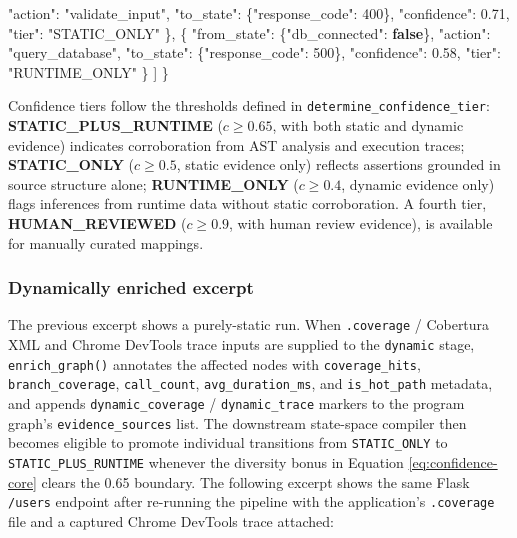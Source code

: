\documentclass[
]{article}
\newenvironment{Shaded}{}{}
\newcommand{\DataTypeTok}[1]{\textcolor[rgb]{0.56,0.13,0.00}{#1}}
\newcommand{\DecValTok}[1]{\textcolor[rgb]{0.25,0.63,0.44}{#1}}
\newcommand{\FloatTok}[1]{\textcolor[rgb]{0.25,0.63,0.44}{#1}}
\newcommand{\FunctionTok}[1]{\textcolor[rgb]{0.02,0.16,0.49}{#1}}
\newcommand{\KeywordTok}[1]{\textcolor[rgb]{0.00,0.44,0.13}{\textbf{#1}}}
\newcommand{\OtherTok}[1]{\textcolor[rgb]{0.00,0.44,0.13}{#1}}
\newcommand{\StringTok}[1]{\textcolor[rgb]{0.25,0.44,0.63}{#1}}
\begin{document}
\begin{Shaded}
\begin{Highlighting}[]
      \DataTypeTok{"action"}\FunctionTok{:} \StringTok{"validate\_input"}\FunctionTok{,}
      \DataTypeTok{"to\_state"}\FunctionTok{:} \FunctionTok{\{}\DataTypeTok{"response\_code"}\FunctionTok{:} \DecValTok{400}\FunctionTok{\},}
      \DataTypeTok{"confidence"}\FunctionTok{:} \FloatTok{0.71}\FunctionTok{,}
      \DataTypeTok{"tier"}\FunctionTok{:} \StringTok{"STATIC\_ONLY"}
    \FunctionTok{\}}\OtherTok{,}
    \FunctionTok{\{}
      \DataTypeTok{"from\_state"}\FunctionTok{:} \FunctionTok{\{}\DataTypeTok{"db\_connected"}\FunctionTok{:} \KeywordTok{false}\FunctionTok{\},}
      \DataTypeTok{"action"}\FunctionTok{:} \StringTok{"query\_database"}\FunctionTok{,}
      \DataTypeTok{"to\_state"}\FunctionTok{:} \FunctionTok{\{}\DataTypeTok{"response\_code"}\FunctionTok{:} \DecValTok{500}\FunctionTok{\},}
      \DataTypeTok{"confidence"}\FunctionTok{:} \FloatTok{0.58}\FunctionTok{,}
      \DataTypeTok{"tier"}\FunctionTok{:} \StringTok{"RUNTIME\_ONLY"}
    \FunctionTok{\}}
  \OtherTok{]}
\FunctionTok{\}}
\end{Highlighting}
\end{Shaded}

Confidence tiers follow the thresholds defined in
\texttt{determine\_confidence\_tier}: \textbf{STATIC\_PLUS\_RUNTIME}
(\(c \geq 0.65\), with both static and dynamic evidence) indicates
corroboration from AST analysis and execution traces;
\textbf{STATIC\_ONLY} (\(c \geq 0.5\), static evidence only) reflects
assertions grounded in source structure alone; \textbf{RUNTIME\_ONLY}
(\(c \geq 0.4\), dynamic evidence only) flags inferences from runtime
data without static corroboration. A fourth tier,
\textbf{HUMAN\_REVIEWED} (\(c \geq 0.9\), with human review evidence),
is available for manually curated mappings.

\subsubsection{Dynamically enriched
excerpt}\label{dynamically-enriched-excerpt}

The previous excerpt shows a purely-static run. When \texttt{.coverage}
/ Cobertura XML and Chrome DevTools trace inputs are supplied to the
\texttt{dynamic} stage, \texttt{enrich\_graph()} annotates the affected
nodes with \texttt{coverage\_hits}, \texttt{branch\_coverage},
\texttt{call\_count}, \texttt{avg\_duration\_ms}, and
\texttt{is\_hot\_path} metadata, and appends \texttt{dynamic\_coverage}
/ \texttt{dynamic\_trace} markers to the program graph's
\texttt{evidence\_sources} list. The downstream state-space compiler
then becomes eligible to promote individual transitions from
\texttt{STATIC\_ONLY} to \texttt{STATIC\_PLUS\_RUNTIME} whenever the
diversity bonus in Equation \ref{eq:confidence-core} clears the 0.65
boundary. The following excerpt shows the same Flask \texttt{/users}
endpoint after re-running the pipeline with the application's
\texttt{.coverage} file and a captured Chrome DevTools trace attached:
\end{document}
